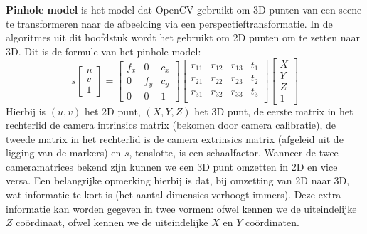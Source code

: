 \textbf{Pinhole model} is het model dat OpenCV gebruikt om 3D punten van een scene te transformeren naar de afbeelding via een perspectieftransformatie. In de algoritmes uit dit hoofdstuk wordt het gebruikt om 2D punten om te zetten naar 3D. Dit is de formule van het pinhole model:
$$
s
\begin{bmatrix}
	u \\ 
	v \\
	1
\end{bmatrix} 
=
\begin{bmatrix}
	f_x & 0 & c_x \\ 
	0 & f_y & c_y \\
	0 & 0 & 1
\end{bmatrix} 
\begin{bmatrix}
	r_{11} & r_{12} & r_{13} & t_1 \\ 
	r_{21} & r_{22} & r_{23} & t_2 \\
	r_{31} & r_{32} & r_{33} & t_3 \\
\end{bmatrix}
\begin{bmatrix}
	X \\ 
	Y \\
	Z \\
	1
\end{bmatrix}
$$
Hierbij is $(u,v)$ het 2D punt, $(X,Y,Z)$ het 3D punt, de eerste matrix in het rechterlid de camera intrinsics matrix (bekomen door camera calibratie), de tweede matrix in het rechterlid is de camera extrinsics matrix (afgeleid uit de ligging van de markers) en $s$, tenslotte, is een schaalfactor. Wanneer de twee cameramatrices bekend zijn kunnen we een 3D punt omzetten in 2D en vice versa. Een belangrijke opmerking hierbij is dat, bij omzetting van 2D naar 3D, wat informatie te kort is (het aantal dimensies verhoogt immers). Deze extra informatie kan worden gegeven in twee vormen: ofwel kennen we de uiteindelijke $Z$ co\"ordinaat, ofwel kennen we de uiteindelijke $X$ en $Y$ co\"ordinaten.

